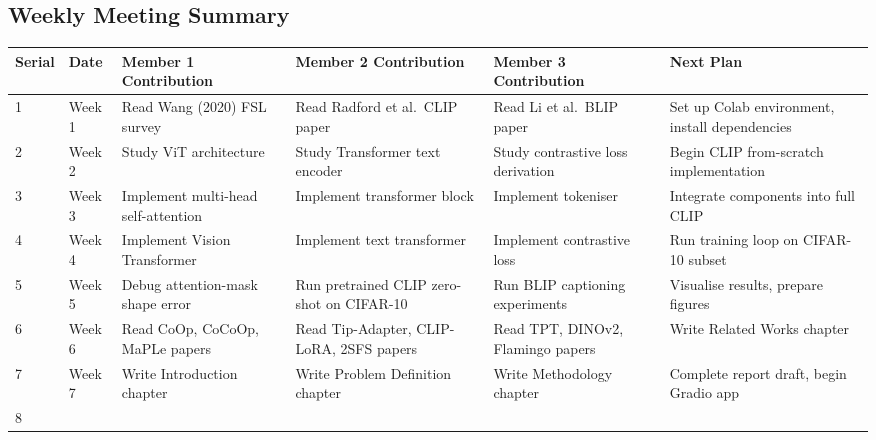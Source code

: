 \documentclass{iutbscthesis}
\begin{document}

\printbib

\begin{appendices}
\chapter{Weekly Meeting Summary}

\begin{table}[h!]
\centering
\renewcommand{\arraystretch}{1.3}
\setlength{\tabcolsep}{4pt}

\begin{tabular}{|p{0.9cm}|p{1.8cm}|p{2.3cm}|p{2.3cm}|p{2.3cm}|p{2.2cm}|}
\hline
\textbf{Serial} & \textbf{Date} & \textbf{Member 1 Contribution} & \textbf{Member 2 Contribution} & \textbf{Member 3 Contribution} & \textbf{Next Plan} \\ \hline
1 & Week 1 & Read Wang (2020) FSL survey & Read Radford et al.\ CLIP paper & Read Li et al.\ BLIP paper & Set up Colab environment, install dependencies \\ \hline
2 & Week 2 & Study ViT architecture & Study Transformer text encoder & Study contrastive loss derivation & Begin CLIP from-scratch implementation \\ \hline
3 & Week 3 & Implement multi-head self-attention & Implement transformer block & Implement tokeniser & Integrate components into full CLIP \\ \hline
4 & Week 4 & Implement Vision Transformer & Implement text transformer & Implement contrastive loss & Run training loop on CIFAR-10 subset \\ \hline
5 & Week 5 & Debug attention-mask shape error & Run pretrained CLIP zero-shot on CIFAR-10 & Run BLIP captioning experiments & Visualise results, prepare figures \\ \hline
6 & Week 6 & Read CoOp, CoCoOp, MaPLe papers & Read Tip-Adapter, CLIP-LoRA, 2SFS papers & Read TPT, DINOv2, Flamingo papers & Write Related Works chapter \\ \hline
7 & Week 7 & Write Introduction chapter & Write Problem Definition chapter & Write Methodology chapter & Complete report draft, begin Gradio app \\ \hline
8 &  &  &  &  &  \\ \hline
\end{tabular}


\end{table}
\end{appendices}
\end{document}
